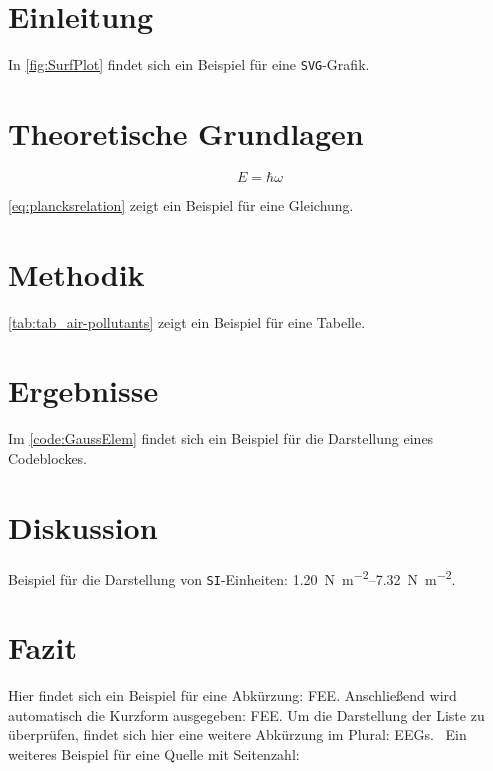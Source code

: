 \section{Einleitung}

\lipsum[24]



In \autoref{fig:SurfPlot} findet sich ein Beispiel für eine \texttt{SVG}-Grafik. \lipsum[13]

\section{Theoretische Grundlagen}

\lipsum[32]

\begin{equation}
	E = \hbar \omega
	\label{eq:plancksrelation}
\end{equation}

\autoref{eq:plancksrelation} zeigt ein Beispiel für eine Gleichung. \lipsum

\section{Methodik}

\lipsum[27]



\autoref{tab:tab_air-pollutants} zeigt ein Beispiel für eine Tabelle. \lipsum

\section{Ergebnisse}

\lipsum[14]



Im \autoref{code:GaussElem} findet sich ein Beispiel für die Darstellung eines Codeblockes. \lipsum

\section{Diskussion}

\lipsum[18] Beispiel für die Darstellung von \texttt{SI}-Einheiten: \SIrange{1.20}{7.32}{\newton\per\square\meter}. \lipsum

\section{Fazit}

Hier findet sich ein Beispiel für eine Abkürzung: \gls{FEE}. Anschließend wird automatisch die Kurzform ausgegeben: \gls{FEE}. Um die Darstellung der Liste zu überprüfen, findet sich hier eine weitere Abkürzung im Plural: \glspl{EEG}. \lipsum~Ein weiteres Beispiel für eine Quelle mit Seitenzahl: \cite[][vgl. S. 12]{WIKUE2006}